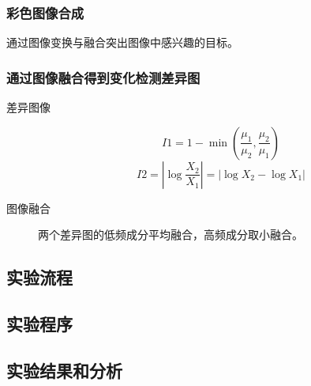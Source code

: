 \subsubsection{彩色图像合成}
通过图像变换与融合突出图像中感兴趣的目标。
\subsubsection{通过图像融合得到变化检测差异图}
\begin{description}
	\item[差异图像] 
	\[ I1=1-\min \left( \frac{\mu_1}{\mu_2},\frac{\mu_2}{\mu_1} \right)  \]
	\[ I2= \left| \log\frac{X_2}{X_1} \right| = \left| \log X_2 - \log X_1 \right|  \]
	\item[图像融合]
	两个差异图的低频成分平均融合，高频成分取小融合。
\end{description}
\subsection{实验流程}
\begin{figure}[H]
	\centering
\end{figure}
\subsection{实验程序}
\subsection{实验结果和分析}